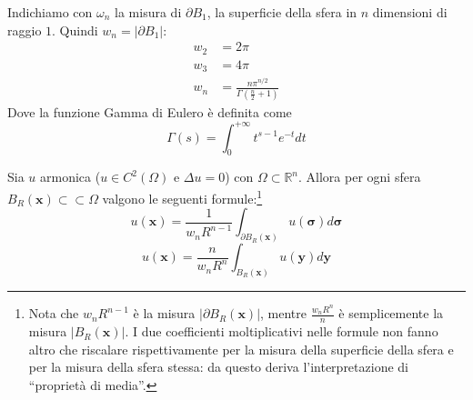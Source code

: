 \documentclass[10pt,a4paper,twoside,openright]{book}
\newcommand{\x}{\mathbf{x}}
\newcommand{\y}{\mathbf{y}}
\begin{document}
Indichiamo con $\displaystyle \omega _{n}$ la misura di $\displaystyle \partial B_{1}$, la superficie della sfera in $\displaystyle n$ dimensioni di raggio $\displaystyle 1$. Quindi $\displaystyle w_{n} =| \partial B_{1}| $:
\begin{align*}
	w_{2} & =2\pi                                                   \\
	w_{3} & =4\pi                                                   \\
	w_{n} & =\frac{n\pi ^{n/2}}{\Gamma \left(\frac{n}{2} +1\right)} 
\end{align*}
Dove la funzione Gamma di Eulero è definita come
\begin{equation*}
	\Gamma (s) =\int ^{+\infty }_{0} t^{s-1} e^{-t} dt
\end{equation*}
\begin{theorem}
\label{thm:armonica-allora-pdm}
	Sia $u$ armonica ($u\in C^{2}(\Omega)$ e $\Delta u=0$) con $\Omega \subset \mathbb{R}^{n}$. Allora per ogni sfera $B_{R}(\x) \subset \subset \Omega $ valgono le seguenti formule:\footnote{Nota che $w_{n} R^{n-1}$ è la misura $| \partial B_{R}(\x)| $, mentre $\frac{w_{n} R^{n}}{n}$ è semplicemente la misura $| B_{R}(\x)| $. I due coefficienti moltiplicativi nelle formule non fanno altro che riscalare rispettivamente per la misura della superficie della sfera e per la misura della sfera stessa: da questo deriva l'interpretazione di ``proprietà di media''.}
	\begin{equation}
		u(\x) =\frac{1}{w_{n} R^{n-1}}\int _{\partial B_{R}(\x)} u(\bm{\sigma}) d\bm{\sigma} 
		\label{eq:lap-prop-media-i}
	\end{equation}
	\begin{equation}
		u(\x) =\frac{n}{w_{n} R^{n}}\int _{B_{R}(\x)} u(\y) d\y
		\label{eq:lap-prop-media-ii}
	\end{equation}
\end{theorem}
\end{document}
